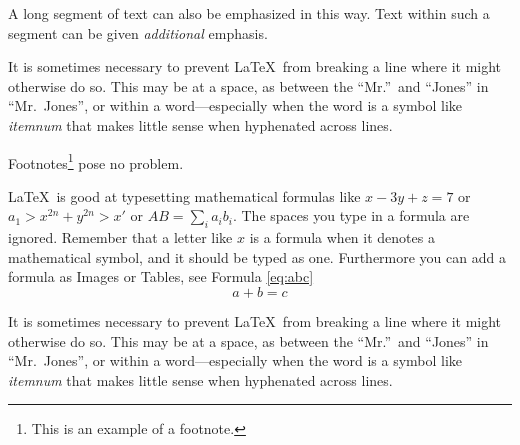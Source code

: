 \begin{em}
	A long segment of text can also be emphasized 
	in this way.  Text within such a segment can be 
	given \emph{additional} emphasis.
\end{em}

It is sometimes necessary to prevent \LaTeX\ from
breaking a line where it might otherwise do so.
This may be at a space, as between the ``Mr.''\ and
``Jones'' in
``Mr.~Jones'',        %
or within a word---especially when the word is a
symbol like
\mbox{\emph{itemnum}} 
that makes little sense when hyphenated across
lines.

Footnotes\footnote{This is an example of a footnote.}
pose no problem.

\LaTeX\ is good at typesetting mathematical formulas
like
\( x-3y + z = 7 \) 
or
\( a_{1} > x^{2n} + y^{2n} > x' \)
or  
\( AB  = \sum_{i} a_{i} b_{i} \).
The spaces you type in a formula are 
ignored.  Remember that a letter like
$x$                   %
is a formula when it denotes a mathematical
symbol, and it should be typed as one.
Furthermore you can add a formula as Images or Tables, see Formula  \hyperref[eq:abc]{\ref{eq:abc}}
\begin{equation}
	\label{eq:abc}
	a+b=c
\end{equation}

It is sometimes necessary to prevent \LaTeX\ from
breaking a line where it might otherwise do so.
This may be at a space, as between the ``Mr.''\ and
``Jones'' in
``Mr.~Jones'',        %
or within a word---especially when the word is a
symbol like
\mbox{\emph{itemnum}} 
that makes little sense when hyphenated across
lines.
